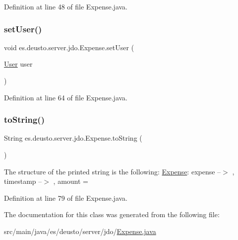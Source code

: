 Definition at line 48 of file Expense.\+java.

\mbox{\label{classes_1_1deusto_1_1server_1_1jdo_1_1_expense_ab15c5d072af65f8a6f09467e6567db5b}} 
\subsubsection{\texorpdfstring{set\+User()}{setUser()}}
{\footnotesize\ttfamily void es.\+deusto.\+server.\+jdo.\+Expense.\+set\+User (\begin{DoxyParamCaption}\item[{\hyperlink{classes_1_1deusto_1_1server_1_1jdo_1_1_user}{User}}]{user }\end{DoxyParamCaption})}



Definition at line 64 of file Expense.\+java.

\mbox{\label{classes_1_1deusto_1_1server_1_1jdo_1_1_expense_a0f197f3e223803cab5fba71cc481af31}} 
\subsubsection{\texorpdfstring{to\+String()}{toString()}}
{\footnotesize\ttfamily String es.\+deusto.\+server.\+jdo.\+Expense.\+to\+String (\begin{DoxyParamCaption}{ }\end{DoxyParamCaption})}

The structure of the printed string is the following\+: \hyperlink{classes_1_1deusto_1_1server_1_1jdo_1_1_expense}{Expense}\+: expense --$>$ , timestamp --$>$ , amount = 

Definition at line 79 of file Expense.\+java.



The documentation for this class was generated from the following file\+:\begin{DoxyCompactItemize}
\item 
src/main/java/es/deusto/server/jdo/\hyperlink{_expense_8java}{Expense.\+java}\end{DoxyCompactItemize}
